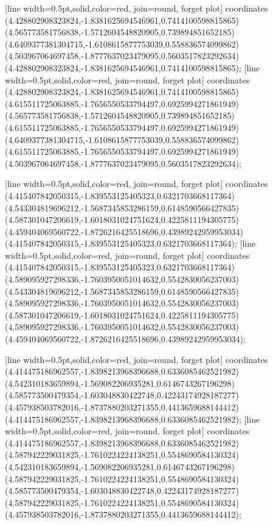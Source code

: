 [line width=0.5pt,solid,color=red, join=round, forget plot] coordinates {(4.428802908323824,-1.8381625694546961,0.7414100598815865) (4.565773581756838,-1.5712604548820905,0.739894851652185) (4.6409377381304715,-1.6108615877753039,0.558836574099862) (4.503967064697458,-1.8777637023479095,0.5603517823292634) (4.428802908323824,-1.8381625694546961,0.7414100598815865)};
[line width=0.5pt,solid,color=red, join=round, forget plot] coordinates {(4.428802908323824,-1.8381625694546961,0.7414100598815865) (4.615511725063885,-1.7656550533794497,0.6925994271861949) (4.565773581756838,-1.5712604548820905,0.739894851652185) (4.615511725063885,-1.7656550533794497,0.6925994271861949) (4.6409377381304715,-1.6108615877753039,0.558836574099862) (4.615511725063885,-1.7656550533794497,0.6925994271861949) (4.503967064697458,-1.8777637023479095,0.5603517823292634)};

[line width=0.5pt,solid,color=red, join=round, forget plot] coordinates {(4.415407842050315,-1.839553125405323,0.6321703668117364) (4.543304819696212,-1.5687345853286159,0.6148590566427835) (4.587301047206619,-1.6018031024751624,0.4225811194305775) (4.459404069560722,-1.8726216425518696,0.43989242959953034) (4.415407842050315,-1.839553125405323,0.6321703668117364)};
[line width=0.5pt,solid,color=red, join=round, forget plot] coordinates {(4.415407842050315,-1.839553125405323,0.6321703668117364) (4.589095927298336,-1.7603950051014632,0.5542830056237003) (4.543304819696212,-1.5687345853286159,0.6148590566427835) (4.589095927298336,-1.7603950051014632,0.5542830056237003) (4.587301047206619,-1.6018031024751624,0.4225811194305775) (4.589095927298336,-1.7603950051014632,0.5542830056237003) (4.459404069560722,-1.8726216425518696,0.43989242959953034)};

[line width=0.5pt,solid,color=red, join=round, forget plot] coordinates {(4.414475186962557,-1.8398213968396688,0.6336085462521982) (4.542310183659894,-1.569082206935281,0.6146743267196298) (4.585773500479354,-1.603048830422748,0.42243174928187277) (4.457938503782016,-1.8737880203271355,0.4413659688144412) (4.414475186962557,-1.8398213968396688,0.6336085462521982)};
[line width=0.5pt,solid,color=red, join=round, forget plot] coordinates {(4.414475186962557,-1.8398213968396688,0.6336085462521982) (4.587942229031825,-1.7610224224138251,0.5548690584130324) (4.542310183659894,-1.569082206935281,0.6146743267196298) (4.587942229031825,-1.7610224224138251,0.5548690584130324) (4.585773500479354,-1.603048830422748,0.42243174928187277) (4.587942229031825,-1.7610224224138251,0.5548690584130324) (4.457938503782016,-1.8737880203271355,0.4413659688144412)};

